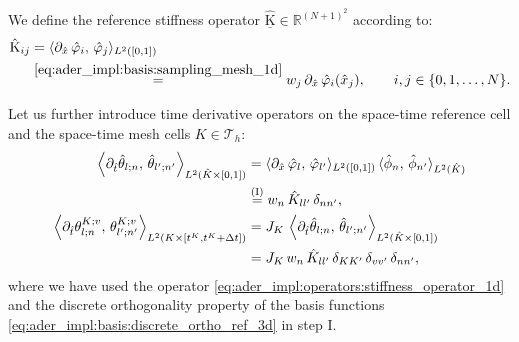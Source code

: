\documentclass{scrreprt}
\theoremstyle{definition}
\theoremstyle{nonumberplain}
\newcommand{\laMat}[1]{\underline{\mathrm{#1}}}
\newcommand{\laMatel}[1]{\mathrm{#1}}
\newcommand{\tria}{\mathcal{T}_h}
\newcommand{\cell}{K}
\newcommand{\refCell}{\hat{\cell}}
\newcommand{\detJ}{J_\cell}
\begin{document}
We define the reference stiffness operator
$\laMat{\hat{K}}\in\mathbb{R}^{(N+1)^2}$ according to:
\begin{align}
\label{eq:ader_impl:operators:stiffness_operator_1d}
\laMatel{\hat{K}}_{ij} &=
\langle
\partial_{\hat{x}}\,\hat{\varphi}_{i},\,\hat{\varphi}_{j}\rangle_{L^2([0,1])}
\notag\\
&
\overset{\eqref{eq:ader_impl:basis:sampling_mesh_1d}}
=
w_{j}\,
\partial_{\hat{x}}\,\hat{\varphi}_{i}(\hat{x}_{j}),\qquad
i,j\in\{0,1,\ldots,N\}.
\end{align}

Let us further introduce time derivative operators on the space-time reference
cell and the space-time mesh cells $\cell\in\tria$:
\begin{align}
\label{eq:ader_impl:operators:stiffness_operator_time_ref}
\left\langle
\partial_{\hat{t}}\hat{\theta}_{l;n},\,
\hat{\theta}_{l';n'}
\right\rangle
_{L^2(\refCell\times[0,1])}
&=
\langle
\partial_{\hat{x}}\,\hat{\varphi}_{l},\,\hat{\varphi}_{l'}\rangle_{L^2([0,1])}
\,
\langle \hat{\phi}_{n},\,\hat{\phi}_{n'}\rangle_{L^2(\refCell)}\notag
\\
&\overset{\textup{(I)}}{=}
w_{n}\,\hat{K}_{ll'}\,\delta_{n n'},
\\
\label{eq:ader_impl:operators:stiffness_operator_time_mesh}
\left\langle
\partial_{\hat{t}}\theta^{\cell;v}_{l;n},\,
\theta^{\cell;v}_{l';n'}
\right\rangle
_{L^2(\cell\times[t^\cell,t^\cell+\Delta t])}
&=
\detJ\,
\left\langle
\partial_{\hat{t}}\hat{\theta}_{l;n},\,
\hat{\theta}_{l';n'}
\right\rangle
_{L^2(\refCell\times[0,1])}
\notag
\\
&=
\detJ\,
w_{n}\,
\hat{K}_{ll'}\,
\delta_{\cell\cell'}\,\delta_{vv'}\,
\delta_{n n'},
\end{align}
where we have used the operator
\eqref{eq:ader_impl:operators:stiffness_operator_1d} and
the discrete orthogonality property of the basis functions
\eqref{eq:ader_impl:basis:discrete_ortho_ref_3d} in step I.
\end{document}
